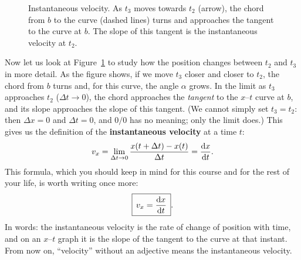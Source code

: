 \documentclass[11pt,a4paper]{article}
\begin{document}
\begin{figure}[ht]
\centering
{}
\caption{Instantaneous velocity. As $t_3$ moves towards $t_2$ (arrow), the chord from $b$ to the
curve (dashed lines) turns and approaches the tangent to the curve at $b$. The slope of this
tangent is the instantaneous velocity at $t_2$.}\label{fig:tangent}
\end{figure}

Now let us look at Figure~\ref{fig:tangent} to study how the position changes between $t_2$ and
$t_3$ in more detail. As the figure shows, if we move $t_3$ closer and closer to $t_2$, the chord
from $b$ turns and, for this curve, the angle $\alpha$ grows. In the limit as $t_3$ approaches
$t_2$ ($\Delta t \to 0$), the chord approaches the \emph{tangent} to the $x$--$t$ curve at $b$, and
its slope approaches the slope of this tangent. (We cannot simply set $t_3 = t_2$: then
$\Delta x = 0$ and $\Delta t = 0$, and $0/0$ has no meaning; only the limit does.) This gives us the definition of the \textbf{instantaneous velocity} at a
time $t$:
\begin{equation}\label{eq:vinst-limit}
  v_x = \lim_{\Delta t\to 0}\frac{x(t+\Delta t) - x(t)}{\Delta t} = \frac{\mathrm{d} x}{\mathrm{d} t} .
\end{equation}
This formula, which you should keep in mind for this course and for the rest of your life, is
worth writing once more:
\begin{equation}\label{eq:vinst}
  \boxed{\,v_x = \frac{\mathrm{d} x}{\mathrm{d} t}\,} .
\end{equation}
In words: the instantaneous velocity is the rate of change of position with time, and on an
$x$--$t$ graph it is the slope of the tangent to the curve at that instant. From now on,
``velocity'' without an adjective means the instantaneous velocity.
\end{document}
